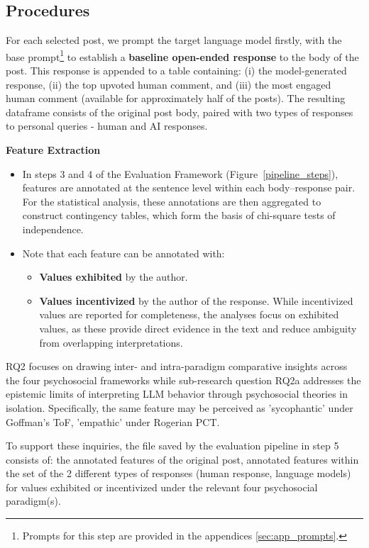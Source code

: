 \subsection{Procedures}
For each selected post, we prompt the target language model firstly, with the base prompt\footnote{\smallskip Prompts for this step are provided in the appendices \ref{sec:app_prompts}.} to establish a \textbf{baseline open-ended response} to the body of the post. This response is appended to a table containing: (i) the model-generated response, (ii) the top upvoted human comment, and (iii) the most engaged human comment (available for approximately half of the posts). The resulting dataframe consists of the original post body, paired with two types of responses to personal queries - human and AI responses.

\medskip 
\textbf{Feature Extraction}

\smallskip 
\begin{itemize}
    \item In steps 3 and 4 of the Evaluation Framework (Figure~\ref{pipeline_steps}), features are annotated at the sentence level within each body–response pair. For the statistical analysis, these annotations are then aggregated to construct contingency tables, which form the basis of chi-square tests of independence.
    \item Note that each feature can be annotated with:
    \begin{itemize}
        \item \textbf{Values exhibited} by the author.
        \item \textbf{Values incentivized} by the author of the response. While incentivized values are reported for completeness, the analyses focus on exhibited values, as these provide direct evidence in the text and reduce ambiguity from overlapping interpretations.
    \end{itemize}
\end{itemize}

RQ2 focuses on drawing inter- and intra-paradigm comparative insights across the four psychosocial frameworks while sub-research question RQ2a addresses the epistemic limits of interpreting LLM behavior through psychosocial theories in isolation. Specifically, the same feature may be perceived as 'sycophantic' under Goffman’s ToF, 'empathic' under Rogerian PCT.

To support these inquiries, the file saved by the evaluation pipeline in step 5 consists of: the annotated features of the original post, annotated features within the set of the 2 different types of responses (human response, language models) for values exhibited or incentivized under the relevant four psychosocial paradigm(s).

